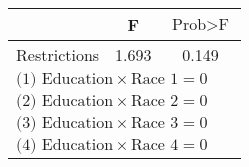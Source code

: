 {
\def\sym#1{\ifmmode^{#1}\else\(^{#1}\)\fi}
\begin{tabular}{l*{1}{cc}}
\hline\hline
          &        F&$\text{Prob}>\text{F}$\\
\hline
Restrictions&    1.693&    0.149\\
\hline\hline
\multicolumn{3}{l}{\footnotesize $\text{(1) Education}\times\text{Race 1} = 0$}\\
\multicolumn{3}{l}{\footnotesize $\text{(2) Education}\times\text{Race 2} = 0$}\\
\multicolumn{3}{l}{\footnotesize $\text{(3) Education}\times\text{Race 3} = 0$}\\
\multicolumn{3}{l}{\footnotesize $\text{(4) Education}\times\text{Race 4} = 0$}\\
\end{tabular}
}
